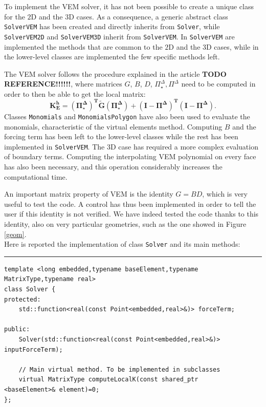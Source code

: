 To implement the VEM solver, it has not been possible to create a unique class for the $2$D and the $3$D cases. As a consequence, a generic abstract class \verb|SolverVEM| has been created and directly inherits from \verb|Solver|, while \verb|SolverVEM2D| and \verb|SolverVEM3D| inherit from \verb|SolverVEM|. In \verb|SolverVEM| are implemented the methods that are common to the $2$D and the $3$D cases, while in the lower-level classes are implemented the few specific methods left. 

The VEM solver follows the procedure explained in the article \textbf{TODO REFERENCE!!!!!!}, where matrices $G$, $B$, $D$, $\Pi_\star^\Delta,\Pi^\Delta$ need to be computed in order to then be able to get the local matrix:
$$ \mathbf{K_E^h= (\Pi^\Delta_\star)^T \tilde{G}
  (\Pi^\Delta_\star)+(I-\Pi^\Delta)^T (I-\Pi^\Delta)}. $$ 
Classes \verb|Monomials| and \verb|MonomialsPolygon| have also been used to evaluate the monomials, characteristic of the virtual elements method. Computing $B$ and the forcing term has been left to the lower-level classes while the rest has been implemented in \verb|SolverVEM|. The $3$D case has required a more complex evaluation of boundary terms. Computing the interpolating VEM polynomial on every face has also been necessary, and this operation considerably increases the computational time. 

An important matrix property of VEM is the identity $G = BD$, which is very useful to test the code. A control has thus been implemented in order to tell the user if this identity is not verified. We have indeed tested the code thanks to this identity, also on very particular geometries, such as the one showed in Figure \ref{geom}. \\

Here is reported the implementation of class \verb|Solver| and its main methods:

\noindent\rule{12.7cm}{1pt}
\begin{verbatim}
template <long embedded,typename baseElement,typename 
MatrixType,typename real>
class Solver {
protected:
    std::function<real(const Point<embedded,real>&)> forceTerm;
	
public:
    Solver(std::function<real(const Point<embedded,real>&)> 
inputForceTerm);

    // Main virtual method. To be implemented in subclasses
    virtual MatrixType computeLocalK(const shared_ptr
<baseElement>& element)=0;
};
\end{verbatim}

